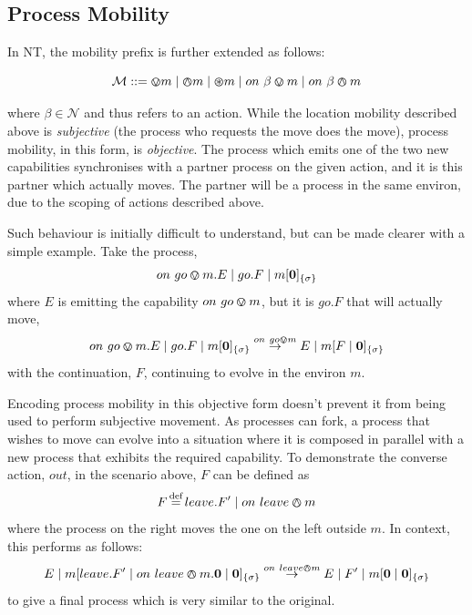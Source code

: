 \subsection{Process Mobility}
\label{procmob}

In NT, the mobility prefix is further extended as follows:

\begin{equation}
   \text{$\mathcal{M}$} \mathrel{::=} \varovee m \mid \varowedge m \mid \varoast m 
      \mid on\ \beta \varovee m \mid on\ \beta \varowedge m
\end{equation}

\noindent where $\beta \in \mathcal{N}$ and thus refers to an action.
While the location mobility described above is \emph{subjective} (the
process who requests the move does the move), process mobility, in this form,
is \emph{objective}.  The process which emits one of the two new
capabilities synchronises with a partner process on the given action,
and it is this partner which actually moves.  The partner will be a
process in the same environ, due to the scoping of actions described
above.

Such behaviour is initially difficult to understand, but can be made
clearer with a simple example.  Take the process,
\begin{equation}
on\ go \varovee m.E \;|\; go.F \;|\; {m}[ \textbf{0} ]_{\{\sigma\}}
\end{equation}
\noindent where $E$ is emitting the capability $on\ go \varovee m$, but it
is $go.F$ that will actually move,
\begin{equation}
on\ go \varovee m.E \;|\; go.F \;|\; {m}[ \textbf{0} ]_{\{\sigma\}} \stackrel{on\ go \varovee m}{\rightarrow}
E \;|\; {m}[ F \;|\; \textbf{0} ]_{\{\sigma\}}
\end{equation}
with the continuation, $F$, continuing to evolve in the environ $m$.   

Encoding process mobility in this objective form doesn't prevent it from
being used to perform subjective movement.  As processes can fork, a
process that wishes to move can evolve into a situation where it is
composed in parallel with a new process that exhibits the required
capability.  To demonstrate the converse action, $out$, in the scenario
above, $F$ can be defined as
\begin{equation}
F \operatorname{\stackrel{\textrm{def}}{=}} leave.F^\prime \;|\; on\ leave \varowedge m
\end{equation}
where the process on the right moves the one on the left outside $m$.
In context, this performs as follows:
\begin{equation}
E \;|\; {m}[ leave.F^\prime \;|\; on\ leave \varowedge m.\textbf{0} \;|\;
 \textbf{0} ]_{\{\sigma\}} 
\stackrel{on\ leave \varowedge m}{\rightarrow}
E \;|\; F^\prime \;|\; {m}[ \textbf{0} \;|\; \textbf{0} ]_{\{\sigma\}}
\end{equation}
to give a final process which is very similar to the original.

